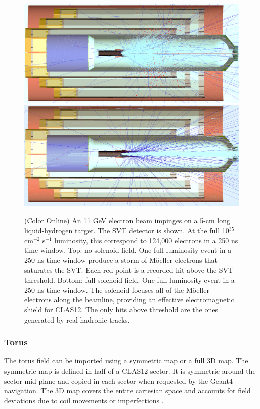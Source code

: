 \begin{figure}
	\centering
	\includegraphics[width=0.98\columnwidth,keepaspectratio]{img/solenoidOFF.png}
	\includegraphics[width=0.98\columnwidth,keepaspectratio]{img/solenoidON.png}
    \caption{(Color Online) An 11 GeV electron beam impinges on a 5-cm long liquid-hydrogen target. The SVT detector is shown.
             At the full 10$^{35}$ cm$^{-2}$ s$^{-1}$ luminosity, this correspond to 124,000 electrons in a 250 ns time window.
			 Top: no solenoid field. One full luminosity event in a 250 ns time window produce a storm of M\"oeller electrons that
             saturates the SVT. Each red point is a recorded hit above the SVT threshold.
			 Bottom: full solenoid field. One full luminosity event in a 250 ns time window.
             The solenoid focuses all of the M\"oeller electrons along the beamline, providing an effective electromagnetic shield for CLAS12.
			 The only hits above threshold are the ones generated by real hadronic tracks. }
	\label{fig:solenoidONOFF}
\end{figure}

\subsubsection{Torus}
The torus field can be imported using a symmetric map or a full 3D map.
The symmetric map is defined in half of a CLAS12 sector. It is symmetric around the sector mid-plane and copied in each sector
when requested by the Geant4 navigation. The 3D map covers the entire cartesian space and accounts for field deviations due to coil
movements or imperfections \cite{GhoshalSolenoid}.

